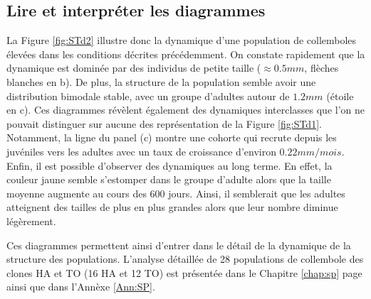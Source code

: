 \subsection{Lire et interpréter les diagrammes}

La Figure \ref{fig:STd2} illustre donc la dynamique d'une population de
collemboles élevées dans les conditions décrites précédemment. On constate
rapidement que la dynamique est dominée par des individus de petite taille
($\approx 0.5mm$, flèches blanches en b). De plus, la structure de la population
semble avoir une distribution bimodale stable, avec un groupe d'adultes autour
de $1.2mm$ (étoile en c). Ces diagrammes révèlent également des dynamiques
interclasses que l'on ne pouvait distinguer sur aucune des représentation de la
Figure \ref{fig:STd1}. Notamment, la ligne du panel (c) montre une cohorte qui
recrute depuis les juvéniles vers les adultes avec un taux de croissance
d'environ $0.22 mm/mois$. Enfin, il est possible d'observer des dynamiques au
long terme. En effet, la couleur jaune semble s'estomper dans le groupe d'adulte
alors que la taille moyenne augmente au cours des $600$ jours. Ainsi, il
semblerait que les adultes atteignent des tailles de plus en plus grandes alors
que leur nombre diminue légèrement. 

Ces diagrammes permettent ainsi d'entrer dans le détail de la dynamique de la
structure des populations. L'analyse détaillée de 28 populations de collembole des clones HA
et TO (16 HA et 12 TO) est présentée dans le Chapitre \ref{chap:sp} page
\pageref{chap:sp} ainsi que dans l'Annèxe \ref{Ann:SP}.



